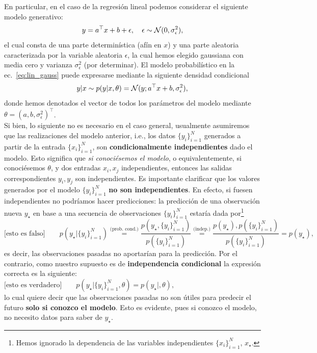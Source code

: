 En particular, en el caso de la regresión lineal podemos considerar el siguiente modelo  generativo:
\begin{equation}
	y = a^\top x + b + \epsilon,\quad \epsilon\sim{\mathcal N}(0,\sigma_\epsilon^2),
	\label{eq:lin_gauss}
\end{equation}
el cual consta de una parte determinística (afín en $x$) y una parte aleatoria caracterizada por la variable aleatoria $\epsilon$, la cual hemos  elegido gaussiana con media cero y varianza $\sigma_\epsilon^2$ (por determinar). El modelo probabilístico en la ec.~\eqref{eq:lin_gauss} puede expresarse mediante la siguiente densidad condicional 
\begin{equation}
	y|x \sim p(y|x,\theta) = {\mathcal N}(y;a^\top x + b ,\sigma_\epsilon^2),\label{eq:mod_lin_gau}
\end{equation}
donde hemos denotados el vector de todos los parámetros del modelo mediante $\theta = (a,b,\sigma_\epsilon^2)^\top$.\\

Si bien, lo siguiente no es necesario en el caso general, usualmente asumiremos que las realizaciones del modelo anterior, i.e., los datos $\{y_i\}_{i=1}^N$ generados a partir de la entrada $\{x_i\}_{i=1}^N$, son \textbf{condicionalmente independientes} dado el modelo. Esto significa que \emph{si conociésemos el modelo}, o  equivalentemente, si conociésemos $\theta$, y dos entradas $x_i,x_j$ independientes, entonces las  salidas correspondientes $y_i,y_j$ son independientes. Es importante clarificar que los valores generados por el modelo $\{y_i\}_{i=1}^N$ \textbf{no son independientes}. En efecto, si fuesen independientes no podríamos hacer predicciones: la predicción de una observación nueva $y_\star$ en base a una secuencia de observaciones $\{y_i\}_{i=1}^N$ estaría dada por\footnote{Hemos ignorado la dependencia de las variables independientes $\{x_i\}_{i=1}^N$, $x_\star$.}
\begin{equation}
	\text{[esto es falso]}\qquad p(y_\star|\{y_i\}_{i=1}^N) 
	\stackrel{\text{(prob. cond.)}}{=} \frac{p(y_\star,\{y_i\}_{i=1}^N)} {p(\{y_i\}_{i=1}^N)} 
	\stackrel{\text{(indep.)}}{=} \frac{p(y_\star),p(\{y_i\}_{i=1}^N)} {p(\{y_i\}_{i=1}^N)}
	=p(y_\star), 
\end{equation}
es decir, las observaciones pasadas no aportarían para la predicción.  Por  el contrario, como nuestro supuesto es de \textbf{independencia condicional} la expresión correcta es  la siguiente: 
\begin{equation}
	\text{[esto es verdadero]} \qquad p(y_\star|\{y_i\}_{i=1}^N,\theta)  
	=p(y_\star|,\theta), \qquad  \qquad\qquad  \qquad \qquad  \qquad\qquad  \qquad
\end{equation}
lo cual quiere decir que las  observaciones pasadas no son útiles para predecir el  futuro \textbf{solo si conozco el modelo}. Esto es evidente, pues si conozco el modelo, no necesito datos para saber de $y_\star$. \\


